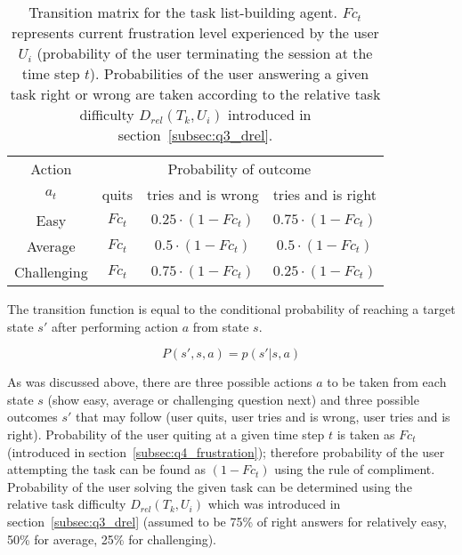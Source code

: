 \begin{itemize}
    \begin{table}[h!]
        \centering
        \begin{tabular}{ c || c | c | c  }
            \toprule
            \hline
            Action & \multicolumn{3}{c}{Probability of outcome} \\
            $a_t$ & quits & tries and is wrong & tries and is right \\
            \hline
            \midrule
            Easy & $Fc_t$ & $ 0.25 \cdot (1 - Fc_t) $ & $0.75 \cdot (1 - Fc_t)$\\
            \hline
            Average & $Fc_t$ & $ 0.5 \cdot (1 - Fc_t) $ & $0.5 \cdot (1 - Fc_t)$\\
            \hline
            Challenging & $Fc_t$ & $ 0.75 \cdot (1 - Fc_t) $ & $0.25 \cdot (1 - Fc_t)$\\
            \bottomrule
        \end{tabular}
        \caption{Transition matrix for the task list-building agent.
        $Fc_t$ represents current frustration level experienced by the user $U_i$ (probability of the user terminating the session at the time step $t$).
        Probabilities of the user answering a given task right or wrong are taken according to the relative task difficulty $D_{rel}(T_k, U_i)$ introduced in section~\ref{subsec:q3_drel}.}
        \label{tab:mdp_transition_matrix}
    \end{table}

    The transition function is equal to the conditional probability of reaching a target state $s'$ after performing action $a$ from state $s$.

    \begin{equation} \label{eq:mdp_transition_function)}
    P(s', s, a) = p(s'|s, a)
    \end{equation}

    As was discussed above, there are three possible actions $a$ to be taken from each state $s$ (show easy, average or challenging question next) and three possible outcomes $s'$ that may follow (user quits, user tries and is wrong, user tries and is right).
    Probability of the user quiting at a given time step $t$ is taken as $Fc_t$ (introduced in section~\ref{subsec:q4_frustration});
    therefore probability of the user attempting the task can be found as $(1 - Fc_t)$ using the rule of compliment.
    Probability of the user solving the given task can be determined using the relative task difficulty $D_{rel}(T_k, U_i)$ which was introduced in section~\ref{subsec:q3_drel} (assumed to be 75\% of right answers for relatively easy, 50\% for average, 25\% for challenging).


\end{itemize}
